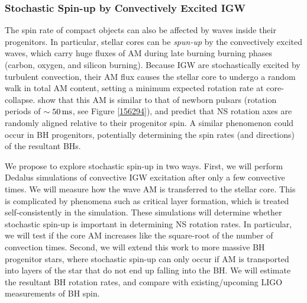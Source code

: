 \subsubsection{Stochastic Spin-up by Convectively Excited IGW}

The spin rate of compact objects can also be affected by waves inside their progenitors. In particular, stellar cores can be {\it spun-up} by the convectively excited waves, which carry huge fluxes of AM during late burning burning phases (carbon, oxygen, and silicon burning). Because IGW are stochastically excited by turbulent convection, their AM flux causes the stellar core to undergo a random walk in total AM content, setting a minimum expected rotation rate at core-collapse. \cite{fullerwave:15} show that this AM is similar to that of newborn pulsars (rotation periods of $\sim 50 \, {\rm ms}$, see Figure \ref{156294}), and predict that NS rotation axes are randomly aligned relative to their progenitor spin. A similar phenomenon could occur in BH progenitors, potentially determining the spin rates (and directions) of the resultant BHs.

We propose to explore stochastic spin-up in two ways. First, we will perform Dedalus simulations of convective IGW excitation after only a few convective times. We will measure how the wave AM is transferred to the stellar core. This is complicated by phenomena such as critical layer formation, which is treated self-consistently in the simulation. These simulations will determine whether stochastic spin-up is important in determining NS rotation rates. In particular, we will test if the core AM increases like the square-root of the number of convection times. Second, we will extend this work to more massive BH progenitor stars, where stochastic spin-up can only occur if AM is transported into layers of the star that do not end up falling into the BH. We will estimate the resultant BH rotation rates, and compare with existing/upcoming LIGO measurements of BH spin.


